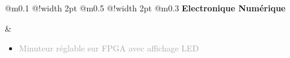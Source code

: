 \documentclass{article}
\begin{document}
\begin{tabular}
    {
        @{}m{}
        @{\hspace{0.001\textwidth}}!{\color{secondaryBlue}\vline width 2pt} %
        @{}m{0.5\textwidth}
        @{\hspace{0.025\textwidth}}!{\color{secondaryBlue}\vline width 2pt} %
        @{{\hspace{0.001\textwidth}}}m{0.3\textwidth}
    }
    \textcolor{secondaryBlue}
    {
        \textbf{Electronique Numérique}
    } 

    &
    \begin{itemize}
        [label={}, topsep=8pt, partopsep=0pt, itemsep=0.5pt, parsep=2pt,after=\vspace*{-\baselineskip}]
        \setlength{\itemsep}{10pt}
        \item \textcolor{darkGray}{Minuteur réglable sur FPGA avec affichage LED}
        \begin{itemize}
        [label={\textcolor{gray!100}{\checkmark}}, topsep=8pt, partopsep=0pt, itemsep=0.5pt, parsep=2pt, after=\vspace*{-\baselineskip}] 


\end{itemize}
\end{itemize}
\end{tabular}
\end{document}
